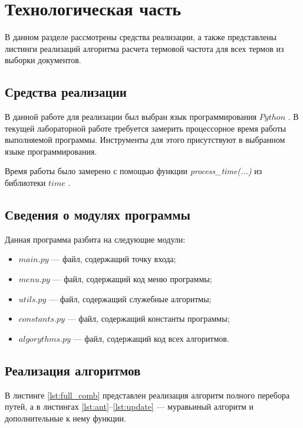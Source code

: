 \chapter{Технологическая часть}

В данном разделе рассмотрены средства реализации, а также представлены листинги реализаций алгоритма расчета термовой частота для всех термов из выборки документов.

\section{Средства реализации}

В данной работе для реализации был выбран язык программирования $Python$ \cite{python-lang}. В текущей лабораторной работе требуется замерить процессорное время работы выполняемой программы. 
Инструменты для этого присутствуют в выбранном языке программирования.

Время работы было замерено с помощью функции \textit{process\_time(...)} из библиотеки $time$ \cite{python-lang-time}.


\section{Сведения о модулях программы}

Данная программа разбита на следующие модули:
\begin{itemize}
	\item $main.py$ --- файл, содержащий точку входа;
	\item $menu.py$ --- файл, содержащий код меню программы;
	\item $utils.py$ --- файл, содержащий служебные алгоритмы;
	\item $constants.py$ --- файл, содержащий константы программы;
	\item $algorythms.py$ --- файл, содержащий код всех алгоритмов. 
\end{itemize}

\section{Реализация алгоритмов}

В листинге \ref{lst:full_comb} представлен реализация алгоритм полного перебора путей, а в листингах \ref{lst:ant}--\ref{lst:update} --- муравьиный алгоритм и дополнительные к нему функции.




